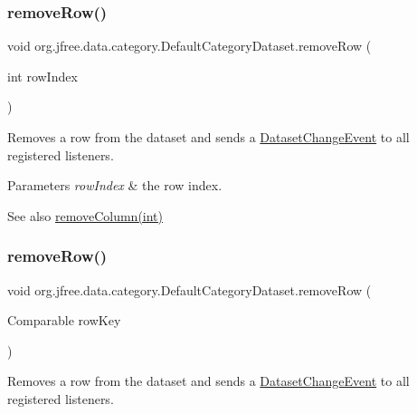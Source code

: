 \subsubsection{\texorpdfstring{remove\+Row()}{removeRow()}\hspace{0.1cm}{\footnotesize\ttfamily [1/2]}}
{\footnotesize\ttfamily void org.\+jfree.\+data.\+category.\+Default\+Category\+Dataset.\+remove\+Row (\begin{DoxyParamCaption}\item[{int}]{row\+Index }\end{DoxyParamCaption})}

Removes a row from the dataset and sends a \mbox{\hyperlink{}{Dataset\+Change\+Event}} to all registered listeners.


\begin{DoxyParams}{Parameters}
{\em row\+Index} & the row index.\\
\hline
\end{DoxyParams}
\begin{DoxySeeAlso}{See also}
\mbox{\hyperlink{classorg_1_1jfree_1_1data_1_1category_1_1_default_category_dataset_a0a509191e2ae0a4af3bb324023eb325b}{remove\+Column(int)}} 
\end{DoxySeeAlso}
\mbox{\label{classorg_1_1jfree_1_1data_1_1category_1_1_default_category_dataset_ab15f418012a69d568cc956997c1e943d}} 
\subsubsection{\texorpdfstring{remove\+Row()}{removeRow()}\hspace{0.1cm}{\footnotesize\ttfamily [2/2]}}
{\footnotesize\ttfamily void org.\+jfree.\+data.\+category.\+Default\+Category\+Dataset.\+remove\+Row (\begin{DoxyParamCaption}\item[{Comparable}]{row\+Key }\end{DoxyParamCaption})}

Removes a row from the dataset and sends a \mbox{\hyperlink{}{Dataset\+Change\+Event}} to all registered listeners.


